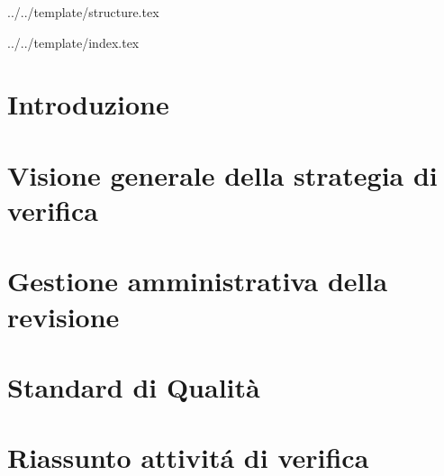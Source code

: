 


\def\DOCUMENTO{Piano di Qualifica}
\def\VERSIONE{1.0.0}

\def\REDATTORE {Bogdan Suierica \\ & Crespan Emanuele}
\def\VERIFICATORE {Burlin Valerio}
\def\RESPONSABILE {Agostinetto Matteo}

\def\USO {Esterno}

\def\DISTRIBUZIONE {\GRUPPO{}\\ & \COMMITTENTE{}\\}

\def\DESCRIZIONE {Documento riguardante le strategie di verifica e validazione adottate dal gruppo \GRUPPO\ necessarie ad assicurare i requisiti qualitativi nello svolgimento del progetto \PROGETTO}


\def\INDICE	{true}
\def\TABELLE {false}
\def\FIGURE {true}


 {../../template/structure.tex}


 {../../template/index.tex}



%

\section{Introduzione}


\newpage
\section{Visione generale della strategia di verifica}


\newpage
\section{Gestione amministrativa della revisione}


\appendix
\newpage
\section{Standard di Qualità}


\newpage
\section{Riassunto attivit\'a di verifica}





